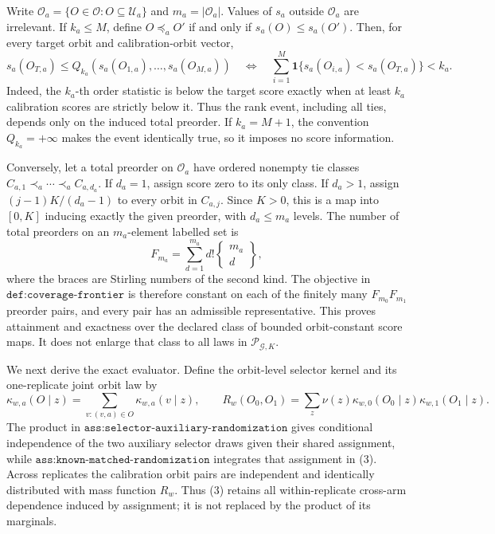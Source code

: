 Write \(\mathcal O_a=\{O\in\mathcal O:O\subseteq\mathcal U_a\}\) and \(m_a=|\mathcal O_a|\). Values of \(s_a\) outside \(\mathcal O_a\) are irrelevant. If \(k_a\le M\), define \(O\preceq_a O'\) if and only if \(s_a(O)\le s_a(O')\). Then, for every target orbit and calibration-orbit vector,
\[
s_a(O_{T,a})\le Q_{k_a}(s_a(O_{1,a}),\ldots,s_a(O_{M,a}))
\quad\Longleftrightarrow\quad
\sum_{i=1}^M\mathbf 1\{s_a(O_{i,a})<s_a(O_{T,a})\}<k_a.
\tag{1}
\]
Indeed, the \(k_a\)-th order statistic is below the target score exactly when at least \(k_a\) calibration scores are strictly below it. Thus the rank event, including all ties, depends only on the induced total preorder. If \(k_a=M+1\), the convention \(Q_{k_a}=+\infty\) makes the event identically true, so it imposes no score information.

Conversely, let a total preorder on \(\mathcal O_a\) have ordered nonempty tie classes \(C_{a,1}\prec_a\cdots\prec_a C_{a,d_a}\). If \(d_a=1\), assign score zero to its only class. If \(d_a>1\), assign \((j-1)K/(d_a-1)\) to every orbit in \(C_{a,j}\). Since \(K>0\), this is a map into \([0,K]\) inducing exactly the given preorder, with \(d_a\le m_a\) levels. The number of total preorders on an \(m_a\)-element labelled set is
\[
F_{m_a}=\sum_{d=1}^{m_a}d!\left\{\begin{matrix}m_a\\ d\end{matrix}\right\},
\tag{2}
\]
where the braces are Stirling numbers of the second kind. The objective in \(\texttt{def:coverage-frontier}\) is therefore constant on each of the finitely many \(F_{m_0}F_{m_1}\) preorder pairs, and every pair has an admissible representative. This proves attainment and exactness over the declared class of bounded orbit-constant score maps. It does not enlarge that class to all laws in \(\mathcal P_{\mathcal G,K}\).

We next derive the exact evaluator. Define the orbit-level selector kernel and its one-replicate joint orbit law by
\[
\kappa_{w,a}(O\mid z)=\sum_{v:(v,a)\in O}\kappa_{w,a}(v\mid z),
\qquad
R_w(O_0,O_1)=\sum_z\nu(z)\kappa_{w,0}(O_0\mid z)\kappa_{w,1}(O_1\mid z).
\tag{3}
\]
The product in \(\texttt{ass:selector-auxiliary-randomization}\) gives conditional independence of the two auxiliary selector draws given their shared assignment, while \(\texttt{ass:known-matched-randomization}\) integrates that assignment in (3). Across replicates the calibration orbit pairs are independent and identically distributed with mass function \(R_w\). Thus (3) retains all within-replicate cross-arm dependence induced by assignment; it is not replaced by the product of its marginals.


